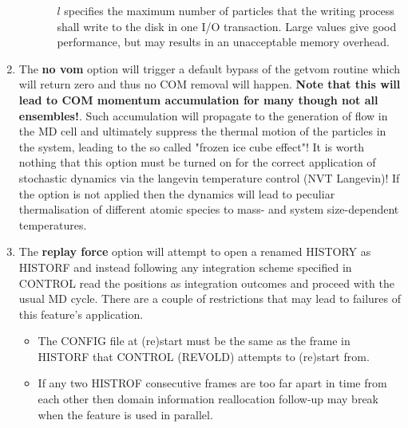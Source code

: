 \begin{enumerate}
\begin{enumerate}
\begin{itemize}
$l$ specifies the maximum number of particles that the
writing process shall write to the disk in one I/O
transaction.  Large values give good performance, but may
results in an unacceptable memory overhead.
\end{itemize}
\end{enumerate}

\item The {\bf no vom} option will trigger a default bypass of
the {\sc getvom} routine which will return zero and thus no COM
removal will happen.  {\bf Note that this will lead to COM momentum
accumulation for many though not all ensembles!}.  Such accumulation
will propagate to the generation of flow in the MD cell and ultimately
suppress the thermal motion of the particles in the system, leading to
the so called "frozen ice cube effect"!  It is worth nothing that this
option must be turned on for the correct application of stochastic
dynamics via the langevin temperature control (NVT Langevin)!  If
the option is not applied then the dynamics will lead to peculiar
thermalisation of different atomic species to mass- and system
size-dependent temperatures.

\item The {\bf replay force} option will attempt to open a renamed
HISTORY as HISTORF and instead following any integration scheme specified
in CONTROL read the positions as integration outcomes and proceed with
the usual MD cycle.  There are a couple of restrictions that may lead to
failures of this feature's application.
\begin{itemize}
\item The CONFIG file at (re)start must be the same as the frame
in HISTORF that CONTROL (REVOLD) attempts to (re)start from.

\item If any two HISTROF consecutive frames are too far apart in
time from each other then domain information reallocation follow-up
may break when the feature is used in parallel.
\end{itemize}


\end{enumerate}
